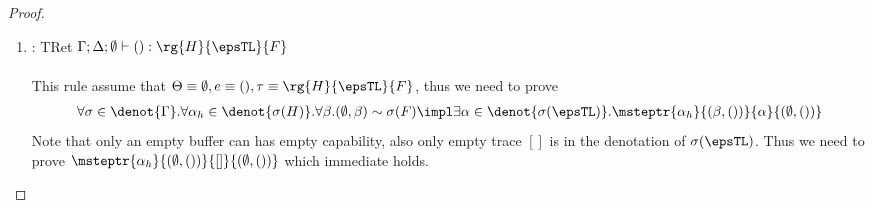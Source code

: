 \begin{proof}
\begin{enumerate}[label=Case]
{\begin{alignat}{2}
\end{alignat}}\noindent
With help of hypothesis \ref{real:1-11} and \ref{real:1-12}, we can instantiate the existential quantified variables as $\beta \mapsto \{ \zevent{op}{\overline{\sigma(v_i)}} \}\cup \beta_1, \alpha \mapsto [\zevent{op}{\overline{\sigma(v_i)}}] \listconcat \alpha$, and we need to prove
{\footnotesize\begin{align*}
    \msteptr{\alpha_h}{(\{ \zevent{op}{\overline{\sigma(v_i)}} \}\cup \beta_1, \zobs{\overline{x}}{op}{e})}{[\zevent{op}{\overline{\sigma(v_i)}}] \listconcat \alpha }{(\emptyset, ())}
\end{align*}}\noindent
According to the well-formed type context (Lemma~\ref{lemma:built-in-typing-sub}), \ref{real:2-1}, \ref{real:2-2}, and \ref{real:1-12}, we have
{\footnotesize\begin{alignat}{2}
& \alpha_h \vDash \zevent{op}{\overline{c}} \Downarrow \beta_2 \ptag{Lemma~\ref{lemma:built-in-typing-sub}} \label{real:2-13}
\\& \msteptr{\alpha_h}{(\beta_1 \cup \beta_2, e)}{\alpha}{(\emptyset, ())} \ptag{hypothesis \ref{real:2-9} and \ref{real:2-10}} \label{real:2-14}
\\& \msteptr{\alpha_h}{(\{ \zevent{op}{\overline{\sigma(v_i)}} \}\cup \beta_1, \zobs{\overline{x}}{op}{e})}{[\zevent{op}{\overline{\sigma(v_i)}}] \listconcat \alpha }{(\emptyset, ())} \ptag{\textsc{StObs}, \ref{real:2-13}, and \ref{real:2-14}}
\end{alignat}}\noindent
which is sufficient to prove the subgoal in this case.

\item:
{\footnotesize
\mprooftr{35mm}
{}
{TRet}
{$\Gamma; \Delta; \emptyset \vdash () : \rg{H}{\epsTL}{F}$}
\ \\ \ \\}
This rule assume that $\Theta \equiv \emptyset, e \equiv (), \tau \equiv \rg{H}{\epsTL}{F}$, thus we need to prove
{\footnotesize\begin{align*}
     \forall \sigma \in \denot{\Gamma}.\forall \alpha_h \in \denot{\sigma(H)}. \forall \beta. (\emptyset, \beta) \sim \sigma(F) \impl \exists \alpha \in\denot{\sigma(\epsTL)}. \msteptr{\alpha_h}{(\beta, ())}{\alpha}{(\emptyset, ())}
\end{align*}}\noindent
Note that only an empty buffer can has empty capability, also only empty trace $[]$ is in the denotation of $\sigma(\epsTL)$. Thus we need to prove $\msteptr{\alpha_h}{(\emptyset, ())}{[]}{(\emptyset, ())}$ which immediate holds.


\end{enumerate}
\end{proof}
